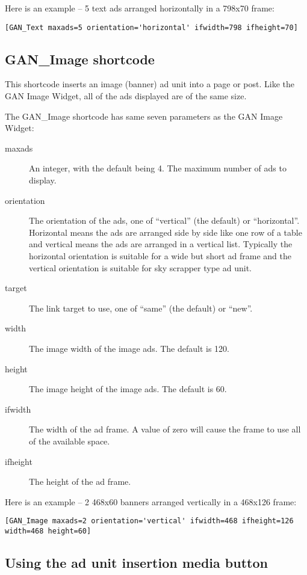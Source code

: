 \documentclass[letterpaper]{article}
\begin{document}
Here is an example -- 5 text ads arranged horizontally in a 798x70 frame:
\begin{verbatim}
[GAN_Text maxads=5 orientation='horizontal' ifwidth=798 ifheight=70]
\end{verbatim}

\subsection{GAN\_Image shortcode}

This shortcode inserts an image (banner) ad unit into a page or post.
Like the GAN Image Widget, all of the ads displayed are of the same
size. 

The GAN\_Image shortcode has same seven parameters as the GAN Image
Widget:
\begin{description}
  \item[maxads] An integer, with the default being 4.
The maximum number of ads to display.
  \item[orientation] The orientation of the ads, one of
``vertical'' (the default) or ``horizontal''. Horizontal means the ads are
arranged side by side like one row of a table and      vertical means
the ads are arranged in a vertical list. Typically the horizontal
orientation is suitable for a wide but short ad frame and the vertical
orientation is suitable for sky scrapper type ad unit.
  \item[target] The link target to use, one of ``same'' (the
default) or ``new''.
  \item[width] The image width of the image ads. The
default is 120.
  \item[height] The image height of the image ads. The
default is 60.
  \item[ifwidth] The width of the ad frame. A value
of zero will cause the frame to use all of the available space.
  \item[ifheight] The height of the ad frame.
\end{description}

Here is an example -- 2 468x60 banners arranged vertically in a 468x126 frame:
\begin{verbatim}
[GAN_Image maxads=2 orientation='vertical' ifwidth=468 ifheight=126 width=468 height=60]
\end{verbatim}

\subsection{Using the ad unit insertion media button}
\end{document}
